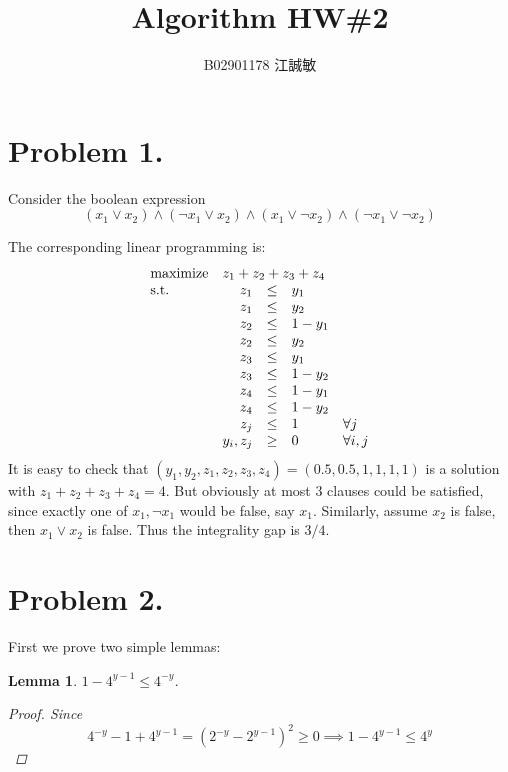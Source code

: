 \documentclass[12pt, a4paper]{article}
\title{Algorithm HW\#2}
\author{B02901178 江誠敏}
\newtheorem{lemma}{Lemma}
\begin{document}
\maketitle
\section{Problem 1.}

Consider the boolean expression
\[ (x_1 \lor x_2) \land (\lnot x_1 \lor x_2)
  \land (x_1 \lor \lnot x_2) \land (\lnot x_1 \lor \lnot x_2) \]

The corresponding linear programming is:
\begin{equation*}
  \begin{array}{>{\displaystyle}l>{\displaystyle}r>{\displaystyle}c*2{>{\displaystyle}l}}
    \text{maximize} & \multicolumn{4}{l}{z_1 + z_2 + z_3 + z_4} \\
    \text{s.t.} & z_1 & \leq & y_1 & \\
    & z_1 & \leq & y_2 & \\
    & z_2 & \leq & 1 - y_1 & \\
    & z_2 & \leq & y_2 & \\
    & z_3 & \leq & y_1 & \\
    & z_3 & \leq & 1 - y_2 & \\
    & z_4 & \leq & 1 - y_1 & \\
    & z_4 & \leq & 1 - y_2 & \\
    & z_j & \leq & 1 & \forall j \\
    & y_i, z_j & \geq & 0 & \forall i, j
  \end{array}
\end{equation*}
It is easy to check that $(y_1, y_2, z_1, z_2, z_3, z_4) = (0.5, 0.5, 1, 1, 1, 1)$ is
a solution with $z_1 + z_2 + z_3 + z_4 = 4$. But obviously at most $3$ clauses could
be satisfied, since exactly one of $x_1, \lnot x_1$ would be false, say $x_1$.
Similarly, assume $x_2$ is false, then $x_1 \lor x_2$ is false.
Thus the integrality gap is $3/4$.

\section{Problem 2.}
First we prove two simple lemmas: \smallskip
\begin{lemma} \label{lemma:ineq-1}
  $1 - 4^{y - 1} \leq 4^{-y}$.
  \begin{proof}
    Since
    \[ 4^{-y} - 1 + 4^{y-1} = (2^{-y} - 2^{y-1})^2 \geq 0 \implies 1 - 4^{y-1} \leq 4^y \]
  \end{proof}
\end{lemma}
\end{document}
